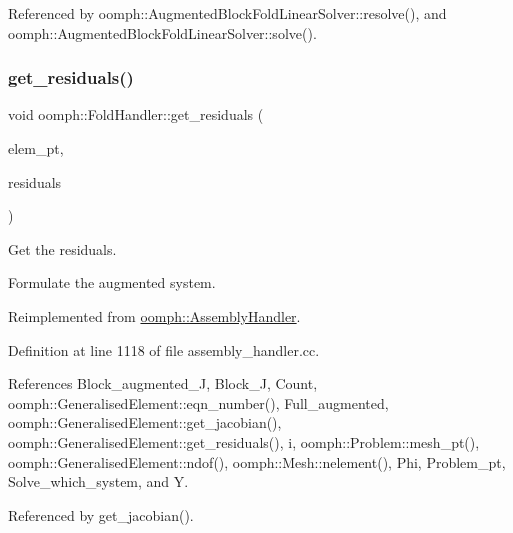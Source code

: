 Referenced by oomph\+::\+Augmented\+Block\+Fold\+Linear\+Solver\+::resolve(), and oomph\+::\+Augmented\+Block\+Fold\+Linear\+Solver\+::solve().

\mbox{\label{classoomph_1_1FoldHandler_abfbec6da3dffeaf3b4df0ee4955101fd}} 
\subsubsection{\texorpdfstring{get\+\_\+residuals()}{get\_residuals()}}
{\footnotesize\ttfamily void oomph\+::\+Fold\+Handler\+::get\+\_\+residuals (\begin{DoxyParamCaption}\item[{\hyperlink{classoomph_1_1GeneralisedElement}{Generalised\+Element} $\ast$const \&}]{elem\+\_\+pt,  }\item[{\hyperlink{classoomph_1_1Vector}{Vector}$<$ double $>$ \&}]{residuals }\end{DoxyParamCaption})\hspace{0.3cm}{\ttfamily [virtual]}}



Get the residuals. 

Formulate the augmented system. 

Reimplemented from \hyperlink{classoomph_1_1AssemblyHandler_a7a6203b0ab90da62b4da2af8a26d08b3}{oomph\+::\+Assembly\+Handler}.



Definition at line 1118 of file assembly\+\_\+handler.\+cc.



References Block\+\_\+augmented\+\_\+J, Block\+\_\+J, Count, oomph\+::\+Generalised\+Element\+::eqn\+\_\+number(), Full\+\_\+augmented, oomph\+::\+Generalised\+Element\+::get\+\_\+jacobian(), oomph\+::\+Generalised\+Element\+::get\+\_\+residuals(), i, oomph\+::\+Problem\+::mesh\+\_\+pt(), oomph\+::\+Generalised\+Element\+::ndof(), oomph\+::\+Mesh\+::nelement(), Phi, Problem\+\_\+pt, Solve\+\_\+which\+\_\+system, and Y.



Referenced by get\+\_\+jacobian().

\mbox{\label{classoomph_1_1FoldHandler_af8e766d1faa7867a0161329566865867}} 
